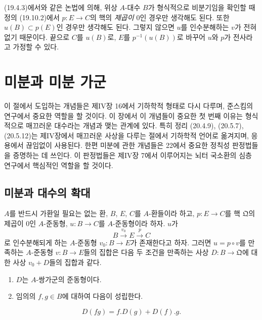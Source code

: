 \begin{remark}[19.10.4]
\label{0.19.10.4-ko}
(19.4.3)에서와 같은 논법에 의해, 위상 $A$-대수 $B$가 형식적으로
비분기임을 확인할 때 정의 (19.10.2)에서 $p:E\to C$의 핵의
\emph{제곱이 $0$}인 경우만 생각해도 된다. 또한 $u(B)\subset p(E)$인
경우만 생각해도 된다. 그렇지 않으면 $u$를 인수분해하는 $v$가 전혀
없기 때문이다. 끝으로 $C$를 $u(B)$로, $E$를 $p^{-1}(u(B))$로 바꾸어
$u$와 $p$가 전사라고 가정할 수 있다.
\end{remark}

\section{미분과 미분 가군}
\label{section:0.20-ko}
\label{0.20-ko}

이 절에서 도입하는 개념들은 제IV장 \textsection16에서 기하학적 형태로
다시 다루며, 준스킴의 연구에서 중요한 역할을 할 것이다. 이 장에서
이 개념들이 중요한 첫 번째 이유는 형식적으로 매끄러운 대수라는 개념과
맺는 관계에 있다. 특히 정리 (20.4.9), (20.5.7), (20.5.12)는 제IV장에서
매끄러운 사상을 다루는 절에서 기하학적 언어로 옮겨지며, 응용에서
끊임없이 사용된다. 한편 미분에 관한 개념들은 \textsection22에서 중요한
정칙성 판정법들을 증명하는 데 쓰인다. 이 판정법들은 제IV장
\textsection7에서 이루어지는 뇌터 국소환의 심층 연구에서 핵심적인
역할을 할 것이다.

\subsection{미분과 대수의 확대}
\label{subsection:0.20.1-ko}

\begin{proposition}[20.1.1]
\label{0.20.1.1-ko}
$A$를 반드시 가환일 필요는 없는 환, $B$, $E$, $C$를 $A$-환들이라
하고, $p:E\to C$를 핵 $\mathfrak Q$의 제곱이 $0$인 $A$-준동형,
$u:B\to C$를 $A$-준동형이라 하자. $u$가
\[
  B\xrightarrow{v_0}E\xrightarrow{p}C
\]
로 인수분해되게 하는 $A$-준동형 $v_0:B\to E$가 존재한다고 하자.
그러면 $u=p\circ v$를 만족하는 $A$-준동형 $v:B\to E$들의 집합은
다음 두 조건을 만족하는 사상 $D:B\to\mathfrak Q$에 대한 사상
$v_0+D$들의 집합과 같다.
\begin{enumerate}
  \item[(i)] $D$는 $A$-쌍가군의 준동형이다.
  \item[(ii)] 임의의 $f,g\in B$에 대하여 다음이 성립한다.
\end{enumerate}
\begin{equation}
\tag{20.1.1.1}
\label{0.20.1.1.1-ko}
  D(fg)=f.D(g)+D(f).g.
\end{equation}
\end{proposition}

